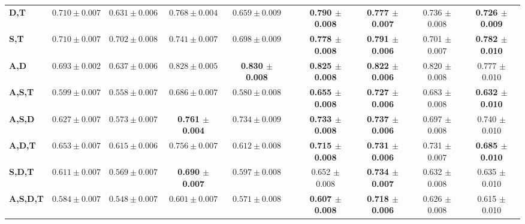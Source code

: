 \begin{table}[!htbp]
\begin{adjustbox}{angle=90}
\begin{tabular}{l|c|c|c|c|c|c|c|c|c|}
		\textbf{D,T} & $0.710 \pm 0.007$ & $0.631 \pm 0.006$ & $0.768 \pm 0.004$ & $0.659 \pm 0.009$ & 						          & \textbf{0.790 $\pm$ 0.008} & \textbf{0.777 $\pm$ 0.007} & 0.736 $\pm$ 0.008 & \textbf{0.726 $\pm$ 0.009} \\
		\textbf{S,T} & $0.710 \pm 0.007$ & $0.702 \pm 0.008$ & $0.741 \pm 0.007$ & $0.698 \pm 0.009$ &  						        & \textbf{0.778 $\pm$ 0.008} & \textbf{0.791 $\pm$ 0.006} & 0.701 $\pm$ 0.007 & \textbf{0.782 $\pm$ 0.010} \\
		\textbf{A,D} & $0.693 \pm 0.002$ & $0.637 \pm 0.006$ & $0.828 \pm 0.005$ & \textbf{0.830 $\pm$ 0.008} & 					  & \textbf{0.825 $\pm$ 0.008} & \textbf{0.822 $\pm$ 0.006} & 0.820 $\pm$ 0.008 & 0.777 $\pm$ 0.010 \\ \hline
		\textbf{A,S,T} & $0.599 \pm 0.007$ & $0.558 \pm 0.007$ & $0.686 \pm 0.007$ & $0.580 \pm 0.008$ &  						      & \textbf{0.655 $\pm$ 0.008} & \textbf{0.727 $\pm$ 0.006} & 0.683 $\pm$ 0.008 & \textbf{0.632 $\pm$ 0.010} \\
		\textbf{A,S,D} & $0.627 \pm 0.007$ & $0.573 \pm 0.007$ & \textbf{0.761 $\pm$ 0.004} & $0.734 \pm 0.009$ &  					& \textbf{0.733 $\pm$ 0.008} & \textbf{0.737 $\pm$ 0.006} & 0.697 $\pm$ 0.008 & 0.740 $\pm$ 0.010 \\
		\textbf{A,D,T} & $0.653 \pm 0.007$ & $0.615 \pm 0.006$ & $0.756 \pm 0.007$ & $0.612 \pm 0.008$ &  						      & \textbf{0.715 $\pm$ 0.008} & \textbf{0.731 $\pm$ 0.006} & 0.731 $\pm$ 0.007 & \textbf{0.685 $\pm$ 0.010} \\
		\textbf{S,D,T} & $0.611 \pm 0.007$ & $0.569 \pm 0.007$ & \textbf{0.690 $\pm$ 0.007} & $0.597 \pm 0.008$ &  					& 0.652 $\pm$ 0.008 & \textbf{0.734 $\pm$ 0.007} & 0.632 $\pm$ 0.008 & 0.635 $\pm$ 0.010 \\ \hline
		\textbf{A,S,D,T} & $0.584 \pm 0.007$ & $0.548 \pm 0.007$ & $0.601 \pm 0.007$ & $0.571 \pm 0.008$ &  						    & \textbf{0.607 $\pm$ 0.008} & \textbf{0.718 $\pm$ 0.006} & 0.626 $\pm$ 0.008 & 0.615 $\pm$ 0.010 \\
	\end{tabular}
	\end{adjustbox}
\end{table}


